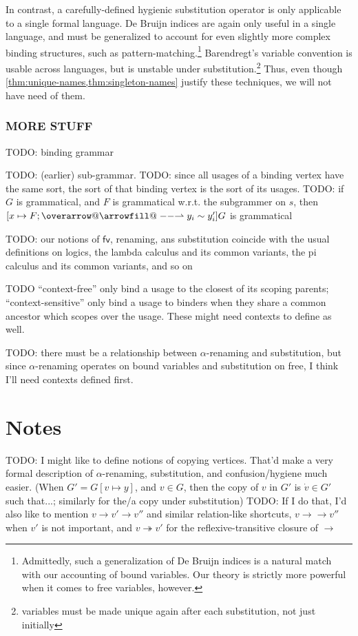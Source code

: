 \documentclass[11pt]{article} %
\makeatletter
\theoremstyle{definition}
\def\rightharpoonupfill@{\arrowfill@\relbar\relbar\rightharpoonup}
\newcommand{\harpvec}{%
   \mathpalette{\overarrow@\rightharpoonupfill@}}
\makeatother
\begin{document}
In contrast, a carefully-defined hygienic substitution operator is only applicable to a single formal language.
De Bruijn indices are again only useful in a single language, and must be generalized to account for even slightly more complex binding structures, such as pattern-matching.\footnote{Admittedly, such a generalization of De Bruijn indices is a natural match with our accounting of bound variables. Our theory is strictly more powerful when it comes to free variables, however.}
Barendregt's variable convention is usable across languages, but is unstable under substitution.\footnote{variables must be made unique again after each substitution, not just initially}
Thus, even though \cref{thm:unique-names,thm:singleton-names} justify these techniques, we will not have need of them.


\section*{MORE STUFF}

TODO: binding grammar

TODO: (earlier) sub-grammar.
TODO: since all usages of a binding vertex have the same sort, the sort of that binding vertex is the sort of its usages.
TODO: if $G$ is grammatical, and $F$ is grammatical w.r.t. the subgrammer on $s$, then $[x \mapsto F; \harpvec{y_i \sim y'_i}]G$ is grammatical

TODO: our notions of $\mathsf{fv}$, renaming, ans substitution coincide with the usual definitions on logics, the lambda calculus and its common variants, the pi calculus and its common variants, and so on

TODO ``context-free'' only bind a usage to the closest of its scoping parents; ``context-sensitive'' only bind a usage to binders when they share a common ancestor which scopes over the usage.
These might need contexts to define as well.

TODO: there must be a relationship between $\alpha$-renaming and substitution, but since $\alpha$-renaming operates on bound variables and substitution on free, I think I'll need contexts defined first.

\part{Notes}

TODO: I might like to define notions of copying vertices. That'd make a very formal description of $\alpha$-renaming, substitution, and confusion/hygiene much easier.
(When $G' = G[v \mapsto y]$, and $v \in G$, then the copy of $v$ in $G'$ is $\dot v \in G'$ such that...; similarly for the/a copy under substitution)
TODO: If I do that, I'd also like to mention $v \to v' \to v''$ and similar relation-like shortcuts, $v\to \to v''$ when $v'$ is not important, and $v \twoheadrightarrow v'$ for the reflexive-transitive closure of $\to$
\end{document}
